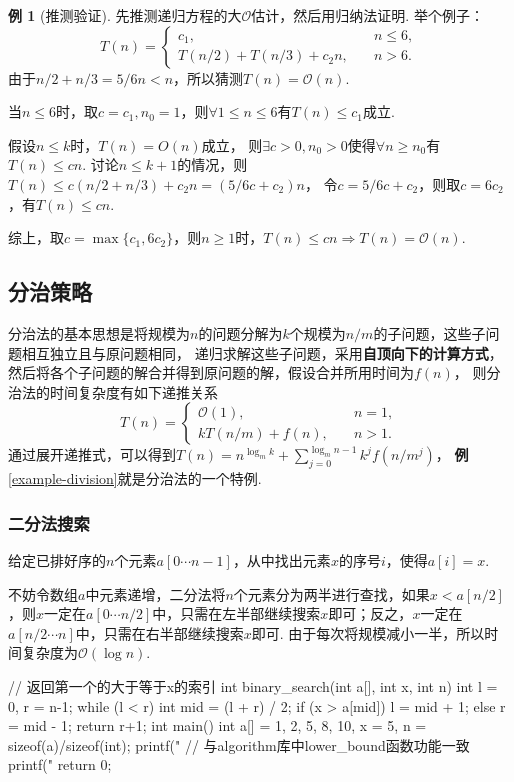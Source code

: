 \documentclass[12pt, a4paper, oneside]{ctexart}
\numberwithin{equation}{section}  %
\theoremstyle{definition}
\newtheorem{example}{例}[section]
\let\leq=\leqslant %
\let\geq=\geqslant %
\def\O{\mathcal{O}}         %
\begin{document}
\begin{example}[推测验证]\label{example-linear}
    先推测递归方程的大$\O$估计，然后用归纳法证明. 举个例子：
    \begin{equation*}
        T(n) = \begin{cases}
            c_1,&\quad n\leq 6,\\
            T(n/2)+T(n/3)+c_2n,&\quad n > 6.
        \end{cases}
    \end{equation*}
    由于$n/2+n/3=5/6n < n$，所以猜测$T(n) = \O(n)$.
    
    当$n\leq 6$时，取$c = c_1,n_0=1$，则$\forall 1\leq n\leq 6$有$T(n)\leq c_1$成立.

    假设$n\leq k$时，$T(n) = O(n)$成立，
    则$\exists c > 0, n_0 > 0$使得$\forall n\geq n_0$有$T(n)\leq cn$.
    讨论$n\leq k+1$的情况，则$T(n)\leq c(n/2+n/3)+c_2n = (5/6c+c_2)n$，
    令$c = 5/6c+c_2$，则取$c = 6c_2$，有$T(n)\leq cn$.

    综上，取$c = \max\{c_1,6c_2\}$，则$n\geq 1$时，$T(n)\leq cn\Rightarrow T(n) = \O(n)$.

\end{example}
\subsection{分治策略}
分治法的基本思想是将规模为$n$的问题分解为$k$个规模为$n/m$的子问题，这些子问题相互独立且与原问题相同，
递归求解这些子问题，采用\textbf{自顶向下的计算方式}，
然后将各个子问题的解合并得到原问题的解，假设合并所用时间为$f(n)$，
则分治法的时间复杂度有如下递推关系
\begin{equation*}
    T(n) = \begin{cases}
        \O(1),&\quad n=1,\\
        kT(n/m)+f(n),&\quad n > 1.
    \end{cases}
\end{equation*}
通过展开递推式，可以得到$T(n) = n^{\log_mk}+\sum_{j=0}^{\log_mn-1}k^jf(n/m^j)$，
\textbf{例}\ref{example-division}就是分治法的一个特例.

\subsubsection{二分法搜索}
给定已排好序的$n$个元素$a[0\cdots n-1]$，从中找出元素$x$的序号$i$，使得$a[i] = x$.

不妨令数组$a$中元素递增，二分法将$n$个元素分为两半进行查找，如果$x < a[n/2]$，则$x$一定在$a[0\cdots n/2]$中，只需在左半部继续搜索$x$即可；反之，$x$一定在$a[n/2\cdots n]$中，只需在右半部继续搜索$x$即可. 由于每次将规模减小一半，所以时间复杂度为$\O(\log n)$.
\begin{cppcode}
// 返回第一个的大于等于x的索引
int binary_search(int a[], int x, int n) {
    int l = 0, r = n-1;
    while (l < r) {
        int mid = (l + r) / 2;
        if (x > a[mid]) l = mid + 1;
        else r = mid - 1;
    }
    return r+1;
}
int main() {
    int a[] = {1, 2, 5, 8, 10}, x = 5, n = sizeof(a)/sizeof(int);
    printf("%
    // 与algorithm库中lower_bound函数功能一致
    printf("%
    return 0;
}
\end{cppcode}
\end{document}
